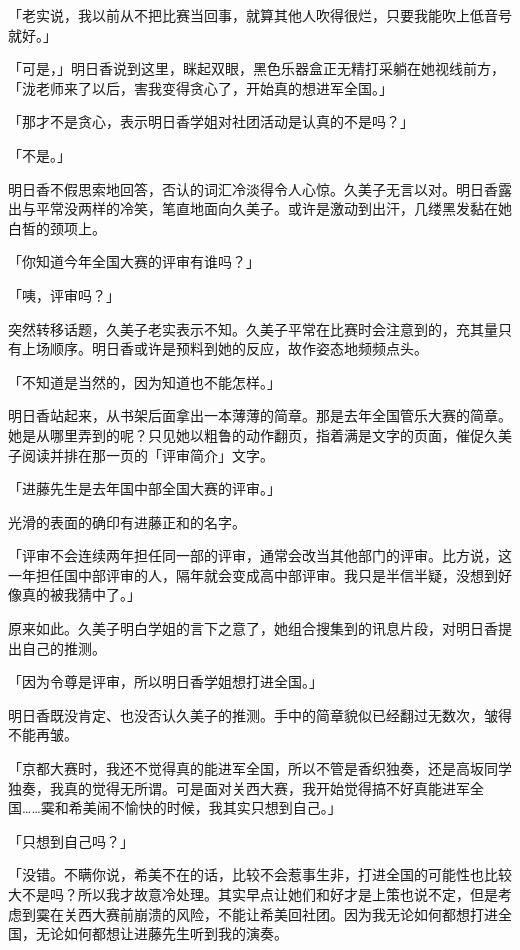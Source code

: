 \documentclass[UTF8]{ctexart}
\begin{document}
    「老实说，我以前从不把比赛当回事，就算其他人吹得很烂，只要我能吹上低音号就好。」 

    「可是，」明日香说到这里，眯起双眼，黑色乐器盒正无精打采躺在她视线前方，「泷老师来了以后，害我变得贪心了，开始真的想进军全国。」 

    「那才不是贪心，表示明日香学姐对社团活动是认真的不是吗？」 

    「不是。」 

    明日香不假思索地回答，否认的词汇冷淡得令人心惊。久美子无言以对。明日香露出与平常没两样的冷笑，笔直地面向久美子。或许是激动到出汗，几缕黑发黏在她白皙的颈项上。 

    「你知道今年全国大赛的评审有谁吗？」 

    「咦，评审吗？」 

    突然转移话题，久美子老实表示不知。久美子平常在比赛时会注意到的，充其量只有上场顺序。明日香或许是预料到她的反应，故作姿态地频频点头。 

    「不知道是当然的，因为知道也不能怎样。」 

    明日香站起来，从书架后面拿出一本薄薄的简章。那是去年全国管乐大赛的简章。她是从哪里弄到的呢？只见她以粗鲁的动作翻页，指着满是文字的页面，催促久美子阅读并排在那一页的「评审简介」文字。 

    「进藤先生是去年国中部全国大赛的评审。」 

    光滑的表面的确印有进藤正和的名字。 

    「评审不会连续两年担任同一部的评审，通常会改当其他部门的评审。比方说，这一年担任国中部评审的人，隔年就会变成高中部评审。我只是半信半疑，没想到好像真的被我猜中了。」 

    原来如此。久美子明白学姐的言下之意了，她组合搜集到的讯息片段，对明日香提出自己的推测。 

    「因为令尊是评审，所以明日香学姐想打进全国。」 

    明日香既没肯定、也没否认久美子的推测。手中的简章貌似已经翻过无数次，皱得不能再皱。 

    「京都大赛时，我还不觉得真的能进军全国，所以不管是香织独奏，还是高坂同学独奏，我真的觉得无所谓。可是面对关西大赛，我开始觉得搞不好真能进军全国……霙和希美闹不愉快的时候，我其实只想到自己。」 

    「只想到自己吗？」 

    「没错。不瞒你说，希美不在的话，比较不会惹事生非，打进全国的可能性也比较大不是吗？所以我才故意冷处理。其实早点让她们和好才是上策也说不定，但是考虑到霙在关西大赛前崩溃的风险，不能让希美回社团。因为我无论如何都想打进全国，无论如何都想让进藤先生听到我的演奏。 
\end{document}
